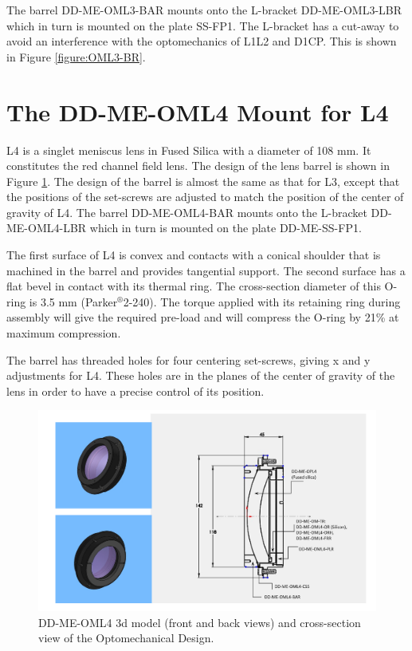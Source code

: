 \documentclass{report}
\begin{document}
The barrel DD-ME-OML3-BAR mounts onto the L-bracket DD-ME-OML3-LBR which in turn is mounted on the plate SS-FP1. The L-bracket has a cut-away to avoid an interference with the optomechanics of L1L2 and D1CP. This is shown in Figure \ref{figure:OML3-BR}.

\section{The DD-ME-OML4 Mount for L4}

L4 is a singlet meniscus lens in Fused Silica with a diameter of 108 mm. It constitutes the red channel field lens. The design of the lens barrel is shown in Figure \ref{figure:OML4-views}. The design of the barrel is almost the same as that for L3, except that the positions of the set-screws are adjusted to match the position of the center of gravity of L4. The barrel DD-ME-OML4-BAR mounts onto the L-bracket DD-ME-OML4-LBR which in turn is mounted on the plate DD-ME-SS-FP1.

The first surface of L4 is convex and contacts with a conical shoulder that is machined in the barrel and provides tangential support. The second surface has a flat bevel in contact with its thermal ring. The cross-section diameter of this O-ring is 3.5 mm (Parker${}^\circledR $2-240). The torque applied with its retaining ring during assembly will give the required pre-load and will compress the O-ring by 21\% at maximum compression.

The barrel has threaded holes for four centering set-screws, giving x and y adjustments for L4. These holes are in the planes of the center of gravity of the lens in order to have a precise control of its position.

\begin{figure}
\begin{center}
\includegraphics[width=1.1\linewidth]{figures/DD-ME-OML4_ID.png}
\end{center}
\caption{DD-ME-OML4 3d model (front and back views) and cross-section view of the Optomechanical Design.}
\label{figure:OML4-views}
\end{figure}
\end{document}
